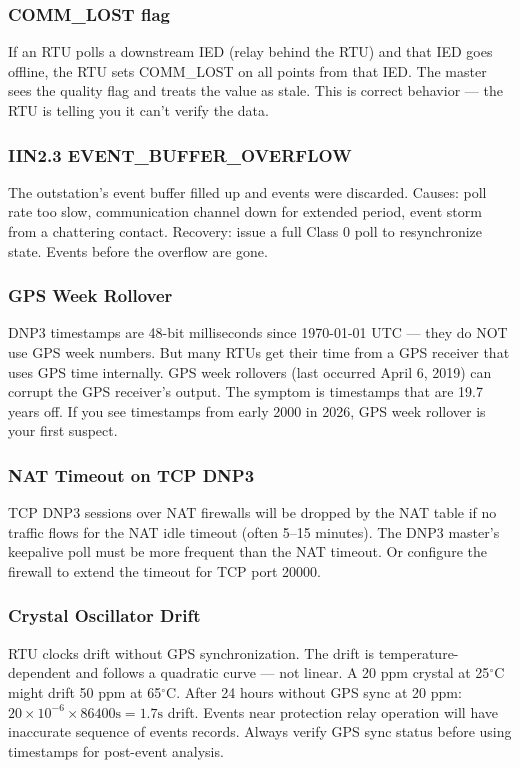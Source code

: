 \documentclass[11pt,twoside]{article}
\begin{document}
\subsubsection{COMM\_LOST flag}
If an RTU polls a downstream IED (relay behind the RTU) and that IED goes offline, the RTU sets COMM\_LOST on all points from that IED. The master sees the quality flag and treats the value as stale. This is correct behavior --- the RTU is telling you it can't verify the data.

\subsubsection{IIN2.3 EVENT\_BUFFER\_OVERFLOW}
The outstation's event buffer filled up and events were discarded. Causes: poll rate too slow, communication channel down for extended period, event storm from a chattering contact. Recovery: issue a full Class 0 poll to resynchronize state. Events before the overflow are gone.

\subsubsection{GPS Week Rollover}
DNP3 timestamps are 48-bit milliseconds since 1970-01-01 UTC --- they do NOT use GPS week numbers. But many RTUs get their time from a GPS receiver that uses GPS time internally. GPS week rollovers (last occurred April 6, 2019) can corrupt the GPS receiver's output. The symptom is timestamps that are 19.7 years off. If you see timestamps from early 2000 in 2026, GPS week rollover is your first suspect.

\subsubsection{NAT Timeout on TCP DNP3}
TCP DNP3 sessions over NAT firewalls will be dropped by the NAT table if no traffic flows for the NAT idle timeout (often 5--15 minutes). The DNP3 master's keepalive poll must be more frequent than the NAT timeout. Or configure the firewall to extend the timeout for TCP port 20000.

\subsubsection{Crystal Oscillator Drift}
RTU clocks drift without GPS synchronization. The drift is temperature-dependent and follows a quadratic curve --- not linear. A 20 ppm crystal at 25$^\circ$C might drift 50 ppm at 65$^\circ$C. After 24 hours without GPS sync at 20 ppm: $20 \times 10^{-6} \times 86400\text{s} = 1.7\text{s}$ drift. Events near protection relay operation will have inaccurate sequence of events records. Always verify GPS sync status before using timestamps for post-event analysis.
\end{document}
